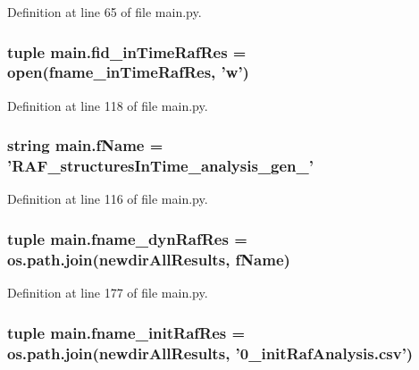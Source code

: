 Definition at line 65 of file main.\+py.

\hypertarget{a00153_ab82095abcedb97b7abf8e003f4724d0c}{
\subsubsection[{fid\+\_\+in\+Time\+Raf\+Res}]{\setlength{\rightskip}{0pt plus 5cm}tuple main.\+fid\+\_\+in\+Time\+Raf\+Res = open({\bf fname\+\_\+in\+Time\+Raf\+Res}, 'w')}}\label{a00153_ab82095abcedb97b7abf8e003f4724d0c}


Definition at line 118 of file main.\+py.

\hypertarget{a00153_a9fff4b23f9489649601960dabc4a6cdd}{
\subsubsection[{f\+Name}]{\setlength{\rightskip}{0pt plus 5cm}string main.\+f\+Name = 'R\+A\+F\+\_\+structures\+In\+Time\+\_\+analysis\+\_\+gen\+\_\+'}}\label{a00153_a9fff4b23f9489649601960dabc4a6cdd}


Definition at line 116 of file main.\+py.

\hypertarget{a00153_a6a031fb0c5a0a5519fc4c3f6d7ef35d1}{
\subsubsection[{fname\+\_\+dyn\+Raf\+Res}]{\setlength{\rightskip}{0pt plus 5cm}tuple main.\+fname\+\_\+dyn\+Raf\+Res = os.\+path.\+join({\bf newdir\+All\+Results}, {\bf f\+Name})}}\label{a00153_a6a031fb0c5a0a5519fc4c3f6d7ef35d1}


Definition at line 177 of file main.\+py.

\hypertarget{a00153_a72ed3f9434cc4dcc2240c6ca408960ff}{
\subsubsection[{fname\+\_\+init\+Raf\+Res}]{\setlength{\rightskip}{0pt plus 5cm}tuple main.\+fname\+\_\+init\+Raf\+Res = os.\+path.\+join({\bf newdir\+All\+Results}, '0\+\_\+init\+Raf\+Analysis.\+csv')}}\label{a00153_a72ed3f9434cc4dcc2240c6ca408960ff}


